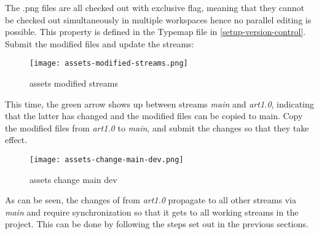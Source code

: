 The .png files are all checked out with exclusive flag, meaning that they cannot be checked out simultaneously 
in multiple workspaces hence no parallel editing is possible. This property is defined in the Typemap file in
\ref{setup-version-control}. Submit the modified files and update the streams:
\begin{figure}[H]
    \centering
    \texttt{[image: assets-modified-streams.png]}
    \setlength{\belowcaptionskip}{-10pt}
    \caption{assets modified streams}
    \label{fig:assets-modified-streams}
\end{figure}
This time, the green arrow shows up between streams \textit{main} and \textit{art1.0}, indicating that the latter has
changed and the modified files can be copied to main. Copy the modified files from \textit{art1.0} to \textit{main}, 
and submit the changes so that they take effect.
\begin{figure}[H]
    \centering
    \texttt{[image: assets-change-main-dev.png]}
    \setlength{\belowcaptionskip}{-10pt}
    \caption{assets change main dev}
    \label{fig:assets-change-main-dev}
\end{figure}
As can be seen, the changes of from \textit{art1.0} propagate to all other streams via \textit{main} and require 
synchronization so that it gets to all working streams in the project. This can be done by following the steps set out in
the previous sections.